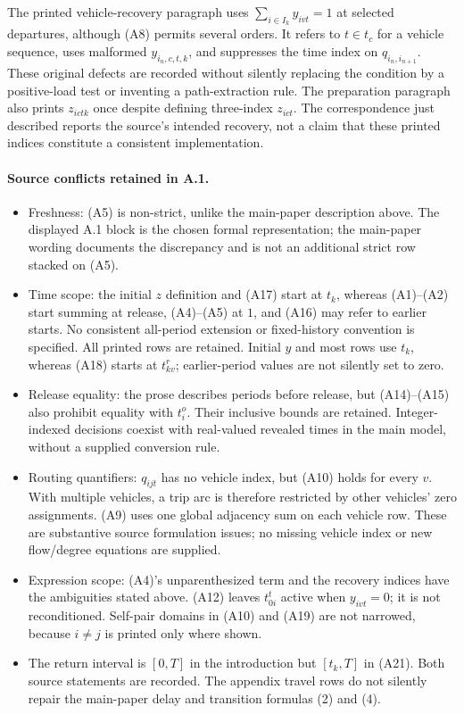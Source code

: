 \documentclass{article}
\begin{document}
The printed vehicle-recovery paragraph uses \(\sum_{i\in I_k}y_{ivt}=1\) at selected departures, although (A8) permits several orders. It refers to \(t\in t_c\) for a vehicle sequence, uses malformed \(y_{i_n,c,t,k}\), and suppresses the time index on \(q_{i_n,i_{n+1}}\). These original defects are recorded without silently replacing the condition by a positive-load test or inventing a path-extraction rule. The preparation paragraph also prints \(z_{ictk}\) once despite defining three-index \(z_{ict}\). The correspondence just described reports the source's intended recovery, not a claim that these printed indices constitute a consistent implementation.

\paragraph{Source conflicts retained in A.1.}
\begin{itemize}
\item Freshness: (A5) is non-strict, unlike the main-paper description above. The displayed A.1 block is the chosen formal representation; the main-paper wording documents the discrepancy and is not an additional strict row stacked on (A5).
\item Time scope: the initial \(z\) definition and (A17) start at \(t_k\), whereas (A1)--(A2) start summing at release, (A4)--(A5) at \(1\), and (A16) may refer to earlier starts. No consistent all-period extension or fixed-history convention is specified. All printed rows are retained. Initial \(y\) and most rows use \(t_k\), whereas (A18) starts at \(t_{kv}^r\); earlier-period values are not silently set to zero.
\item Release equality: the prose describes periods before release, but (A14)--(A15) also prohibit equality with \(t_i^o\). Their inclusive bounds are retained. Integer-indexed decisions coexist with real-valued revealed times in the main model, without a supplied conversion rule.
\item Routing quantifiers: \(q_{ijt}\) has no vehicle index, but (A10) holds for every \(v\). With multiple vehicles, a trip arc is therefore restricted by other vehicles' zero assignments. (A9) uses one global adjacency sum on each vehicle row. These are substantive source formulation issues; no missing vehicle index or new flow/degree equations are supplied.
\item Expression scope: (A4)'s unparenthesized term and the recovery indices have the ambiguities stated above. (A12) leaves \(t_{0i}^t\) active when \(y_{ivt}=0\); it is not reconditioned. Self-pair domains in (A10) and (A19) are not narrowed, because \(i\ne j\) is printed only where shown.
\item The return interval is \([0,T]\) in the introduction but \([t_k,T]\) in (A21). Both source statements are recorded. The appendix travel rows do not silently repair the main-paper delay and transition formulas (2) and (4).
\end{itemize}
\end{document}
